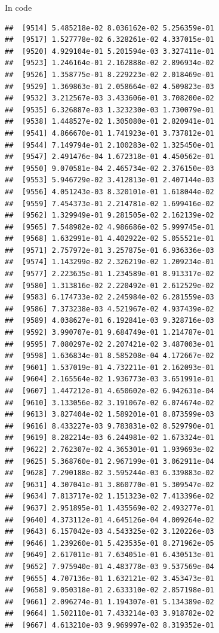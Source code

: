 \documentclass[ignorenonframetext,]{beamer}
\begin{document}
\begin{frame}[fragile]{In code}
\begin{verbatim}
##  [9514] 5.485218e-02 8.036162e-02 5.256359e-01
##  [9517] 1.527778e-02 6.328261e-02 4.337015e-01
##  [9520] 4.929104e-01 5.201594e-03 3.327411e-01
##  [9523] 1.246164e-01 2.162888e-02 2.896934e-02
##  [9526] 1.358775e-01 8.229223e-02 2.018469e-01
##  [9529] 1.369863e-01 2.058664e-02 4.509823e-03
##  [9532] 3.212567e-03 3.433606e-01 3.708200e-02
##  [9535] 6.326887e-03 1.323230e-03 1.730079e-01
##  [9538] 1.448527e-02 1.305080e-01 2.820941e-01
##  [9541] 4.866670e-01 1.741923e-01 3.737812e-01
##  [9544] 7.149794e-01 2.100283e-02 1.325450e-01
##  [9547] 2.491476e-04 1.672318e-01 4.450562e-01
##  [9550] 9.070581e-04 2.465734e-02 2.376150e-03
##  [9553] 5.946729e-02 3.412813e-01 2.407144e-03
##  [9556] 4.051243e-03 8.320101e-01 1.618044e-02
##  [9559] 7.454373e-01 2.214781e-02 1.699416e-02
##  [9562] 1.329949e-01 9.281505e-02 2.162139e-02
##  [9565] 7.548982e-02 4.986686e-02 5.999745e-01
##  [9568] 1.632991e-01 4.402922e-02 5.055521e-01
##  [9571] 2.757972e-01 3.257875e-01 6.936336e-03
##  [9574] 1.143299e-02 2.326219e-02 1.209234e-01
##  [9577] 2.223635e-01 1.234589e-01 8.913317e-02
##  [9580] 1.313816e-02 2.220492e-01 2.612529e-02
##  [9583] 6.174733e-02 2.245984e-02 6.281559e-03
##  [9586] 7.373238e-03 4.521967e-02 4.937439e-02
##  [9589] 4.038627e-01 6.192841e-03 9.328716e-03
##  [9592] 3.990707e-01 9.684749e-01 1.214787e-01
##  [9595] 7.080297e-02 2.207421e-02 3.487003e-01
##  [9598] 1.636834e-01 8.585208e-04 4.172667e-02
##  [9601] 1.537019e-01 4.732211e-01 2.162093e-01
##  [9604] 2.165564e-02 1.936773e-03 3.651991e-01
##  [9607] 1.447212e-01 4.650602e-02 6.942631e-04
##  [9610] 3.133056e-02 3.191067e-02 6.074674e-02
##  [9613] 3.827404e-02 1.589201e-01 8.873599e-03
##  [9616] 8.433227e-03 9.783831e-02 8.529790e-01
##  [9619] 8.282214e-03 6.244981e-02 1.673324e-01
##  [9622] 2.762307e-02 4.365301e-01 1.939693e-02
##  [9625] 5.368760e-01 2.967199e-01 3.062911e-04
##  [9628] 7.290188e-02 3.595244e-03 6.339883e-02
##  [9631] 4.307041e-01 3.860770e-01 5.309547e-02
##  [9634] 7.813717e-02 1.151323e-02 7.413396e-02
##  [9637] 2.951895e-01 1.435569e-02 2.493277e-01
##  [9640] 4.373112e-01 4.645126e-04 4.009264e-02
##  [9643] 6.157042e-03 4.543325e-02 3.120226e-03
##  [9646] 1.239260e-01 5.423535e-01 8.271962e-05
##  [9649] 2.617011e-01 7.634051e-01 6.430513e-01
##  [9652] 7.975940e-01 4.483778e-03 9.537569e-04
##  [9655] 4.707136e-01 1.632121e-02 3.453473e-01
##  [9658] 9.050318e-01 2.633310e-02 2.857198e-01
##  [9661] 2.096274e-01 1.194307e-01 5.134389e-02
##  [9664] 1.502110e-01 7.433214e-03 3.918782e-02
##  [9667] 4.613210e-03 9.969997e-02 8.319352e-01

\end{verbatim}
\end{frame}
\end{document}
